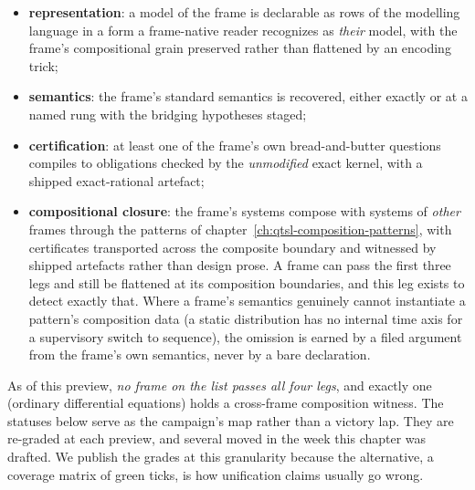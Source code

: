 \begin{itemize}
\item \textbf{representation}: a model of the frame is declarable as
  rows of the modelling language in a form a frame-native reader
  recognizes as \emph{their} model, with the frame's compositional
  grain preserved rather than flattened by an encoding trick;
\item \textbf{semantics}: the frame's standard semantics is
  recovered, either exactly or at a named rung with the bridging
  hypotheses staged;
\item \textbf{certification}: at least one of the frame's own
  bread-and-butter questions compiles to obligations checked by the
  \emph{unmodified} exact kernel, with a shipped exact-rational
  artefact;
\item \textbf{compositional closure}: the frame's systems compose
  with systems of \emph{other} frames through the patterns of
  chapter~\ref{ch:qtsl-composition-patterns}, with certificates
  transported across the composite boundary and witnessed by shipped
  artefacts rather than design prose. A frame can pass the first three
  legs and still be flattened at its composition boundaries, and this
  leg exists to detect exactly that. Where a frame's semantics
  genuinely cannot instantiate a pattern's composition data (a static
  distribution has no internal time axis for a supervisory switch to
  sequence), the omission is earned by a filed argument from the
  frame's own semantics, never by a bare declaration.
\end{itemize}

As of this preview, \emph{no frame on the list passes all four legs},
and exactly one (ordinary differential equations) holds a cross-frame
composition witness. The statuses below serve as the campaign's map
rather than a victory lap. They are re-graded at each preview, and
several moved in the week this chapter was drafted. We publish the
grades at this granularity because the alternative, a coverage matrix
of green ticks, is how unification claims usually go wrong.

